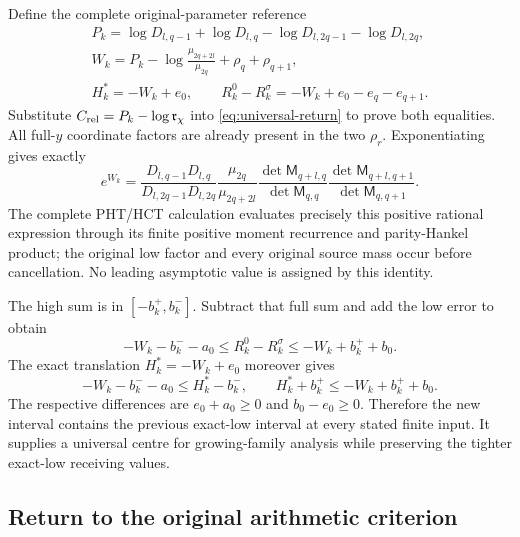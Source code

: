 Define the complete original-parameter reference
\begin{equation}
\begin{gathered}
 P_k=\log D_{l,q-1}+\log D_{l,q}
                         -\log D_{l,2q-1}-\log D_{l,2q},\\
 W_k=P_k-\log\frac{\mu_{2q+2l}}{\mu_{2q}}+\rho_q+\rho_{q+1},\\
 H_k^*=-W_k+e_0,\qquad
 R_k^0-R_k^\sigma=-W_k+e_0-e_q-e_{q+1}.
\end{gathered}\label{eq:universal-entire-centre}
\end{equation}
Substitute $C_{\rm rel}=P_k-\log\mathfrak r_\chi$
into \eqref{eq:universal-return} to prove both equalities.
All full-$y$ coordinate factors are already present in the
two $\rho_r$. Exponentiating gives exactly
\begin{equation}
 e^{W_k}=\frac{D_{l,q-1}D_{l,q}}{D_{l,2q-1}D_{l,2q}}
 \frac{\mu_{2q}}{\mu_{2q+2l}}
 \frac{\det\mathsf M_{q+l,q}}{\det\mathsf M_{q,q}}
 \frac{\det\mathsf M_{q+l,q+1}}{\det\mathsf M_{q,q+1}}.
 \label{eq:positive-entire-centre}
\end{equation}
The complete PHT/HCT calculation evaluates precisely this
positive rational expression through its finite positive moment
recurrence and parity-Hankel product; the original low factor
and every original source mass occur before cancellation.
No leading asymptotic value is assigned by this identity.

The high sum is in $[-b_k^+,b_k^-]$. Subtract that full
sum and add the low error to obtain
\begin{equation}
 -W_k-b_k^--a_0\leq R_k^0-R_k^\sigma
                         \leq-W_k+b_k^++b_0.
 \label{eq:universal-fourth-interval}
\end{equation}
The exact translation $H_k^*=-W_k+e_0$ moreover gives
\begin{equation}
 -W_k-b_k^--a_0\leq H_k^*-b_k^-,\qquad
 H_k^*+b_k^+\leq-W_k+b_k^++b_0.
 \label{eq:universal-interval-containment}
\end{equation}
The respective differences are $e_0+a_0\geq0$ and
$b_0-e_0\geq0$. Therefore the new interval contains
the previous exact-low interval at every stated finite input.
It supplies a universal centre for growing-family analysis
while preserving the tighter exact-low receiving values.

\subsection{Return to the original arithmetic criterion}